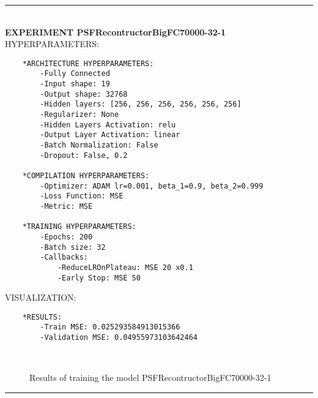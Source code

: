 \rule{0.5\textwidth}{0.5pt}\\

	{\large \textbf{EXPERIMENT PSFRecontructorBigFC70000-32-1}}\\
	
	{\normalsize HYPERPARAMETERS:}
	\begin{lstlisting}	
	*ARCHITECTURE HYPERPARAMETERS:
		-Fully Connected
		-Input shape: 19
		-Output shape: 32768
		-Hidden layers: [256, 256, 256, 256, 256, 256]
		-Regularizer: None
		-Hidden Layers Activation: relu
		-Output Layer Activation: linear
		-Batch Normalization: False
		-Dropout: False, 0.2
	
	*COMPILATION HYPERPARAMETERS:
		-Optimizer: ADAM lr=0.001, beta_1=0.9, beta_2=0.999
		-Loss Function: MSE
		-Metric: MSE
	
	*TRAINING HYPERPARAMETERS:
		-Epochs: 200
		-Batch size: 32
		-Callbacks: 
			-ReduceLROnPlateau: MSE 20 x0.1
			-Early Stop: MSE 50
	\end{lstlisting}
	
	{\normalsize VISUALIZATION:}
	\begin{lstlisting}
	*RESULTS:
        -Train MSE: 0.025293584913015366
        -Validation MSE: 0.04955973103642464
	\end{lstlisting}
	
	\begin{figure*}[ht!]
		\hspace{\fill}
		\hspace{\fill}
		\\
		\caption{Results of training the model PSFRecontructorBigFC70000-32-1}
	\end{figure*}
	
\FloatBarrier	
\rule{0.5\textwidth}{0.5pt}\\